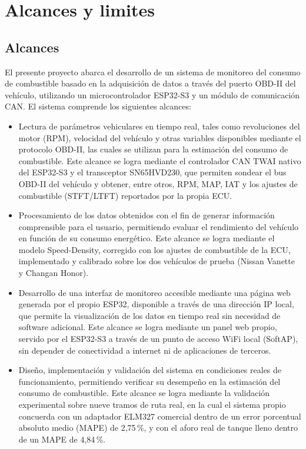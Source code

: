 \section{Alcances y limites}
\subsection{Alcances}
El presente proyecto abarca el desarrollo de un sistema de monitoreo del
consumo de combustible basado en la adquisición de datos a través del puerto OBD-II
del vehículo, utilizando un microcontrolador ESP32-S3 y un módulo de comunicación CAN.
El sistema comprende los siguientes alcances:

\begin{itemize}
	\item Lectura de parámetros vehiculares en tiempo real, tales como revoluciones
	del motor (RPM), velocidad del vehículo y otras variables disponibles mediante el
	protocolo OBD-II, las cuales se utilizan para la estimación del consumo
	de combustible. Este alcance se logra mediante el controlador CAN TWAI nativo
	del ESP32-S3 y el transceptor SN65HVD230, que permiten sondear el bus OBD-II del
	vehículo y obtener, entre otros, RPM, MAP, IAT y los ajustes de combustible
	(STFT/LTFT) reportados por la propia ECU.

	\item Procesamiento de los datos obtenidos con el fin de generar información
	comprensible para el usuario, permitiendo evaluar el rendimiento del vehículo
	en función de su consumo energético. Este alcance se logra mediante el modelo
	Speed-Density, corregido con los ajustes de combustible de la ECU, implementado
	y calibrado sobre los dos vehículos de prueba (Nissan Vanette y Changan Honor).

	\item Desarrollo de una interfaz de monitoreo accesible mediante una página web
	generada por el propio ESP32, disponible a través de una dirección IP local,
	que permite la visualización de los datos en tiempo real sin necesidad de
	software adicional. Este alcance se logra mediante un panel web propio, servido
	por el ESP32-S3 a través de un punto de acceso WiFi local (SoftAP), sin depender
	de conectividad a internet ni de aplicaciones de terceros.

	\item Diseño, implementación y validación del sistema en condiciones reales de
	funcionamiento, permitiendo verificar su desempeño en la estimación del consumo
	de combustible. Este alcance se logra mediante la validación experimental sobre
	nueve tramos de ruta real, en la cual el sistema propio concuerda con un
	adaptador ELM327 comercial dentro de un error porcentual absoluto medio (MAPE)
	de 2,75\,\%, y con el aforo real de tanque lleno dentro de un MAPE de 4,84\,\%.
\end{itemize}
